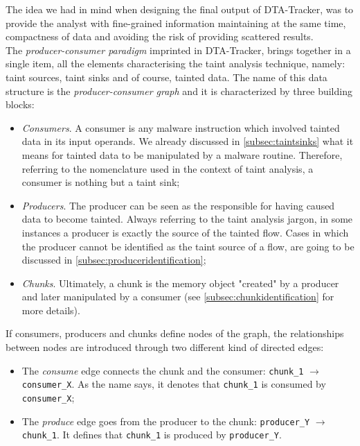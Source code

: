 \documentclass[LaM,binding=0.6cm]{sapthesis}
\begin{document}
The idea we had in mind when designing the final output of DTA-Tracker, was to provide the analyst with fine-grained information maintaining at the same time, compactness of data and avoiding the risk of providing scattered results.\\
The \textit{producer-consumer paradigm} imprinted in DTA-Tracker, brings together in a single item, all the elements characterising the taint analysis technique, namely: taint sources, taint sinks and of course, tainted data. The name of this data structure is the \textit{producer-consumer graph} and it is characterized by three building blocks:
\begin{itemize}
\item \textit{Consumers}. A consumer is any malware instruction which involved tainted data in its input operands. We already discussed in \autoref{subsec:taintsinks} what it means for tainted data to be manipulated by a malware routine. Therefore, referring to the nomenclature used in the context of taint analysis, a consumer is nothing but a taint sink;
\item \textit{Producers}. The producer can be seen as the responsible for having caused data to become tainted. Always referring to the taint analysis jargon, in some instances a producer is exactly the source of the tainted flow. Cases in which the producer cannot be identified as the taint source of a flow, are going to be discussed in \autoref{subsec:produceridentification};
\item \textit{Chunks}. Ultimately, a chunk is the memory object "created" by a producer and later manipulated by a consumer (see \autoref{subsec:chunkidentification} for more details). 
\end{itemize}
If consumers, producers and chunks define nodes of the graph, the relationships between nodes are introduced through two different kind of directed edges:
\begin{itemize}
\item The \textit{consume} edge connects the chunk and the consumer: \texttt{chunk\_1} $\rightarrow$ \texttt{consumer\_X}. As the name says, it denotes that \texttt{chunk\_1}  is consumed by \texttt{consumer\_X};
\item The \textit{produce} edge goes from the producer to the chunk: \texttt{producer\_Y} $\rightarrow$ \texttt{chunk\_1}. It defines that \texttt{chunk\_1} is produced by \texttt{producer\_Y}.
\end{itemize}
\end{document}
